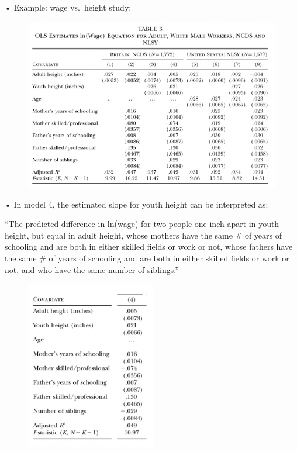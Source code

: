 \documentclass[
  letterpaper,
  DIV=11,
  numbers=noendperiod]{scrreprt}
\begin{document}
• Example: wage vs.~height study:

\begin{figure}

{\centering \includegraphics[width=5.22917in,height=\textheight]{images/mod4_pt2_16.png}

}

\end{figure}

• In model 4, the estimated slope for youth height can be interpreted
as:

``The predicted difference in ln(wage) for two people one inch apart in
youth height, but equal in adult height, whose mothers have the same \#
of years of schooling and are both in either skilled fields or work or
not, whose fathers have the same \# of years of schooling and are both
in either skilled fields or work or not, and who have the same number of
siblings.''

\begin{figure}

\includegraphics[width=2.25in,height=\textheight]{images/mod4_pt2_17.png} \hfill{}

\end{figure}
\end{document}

